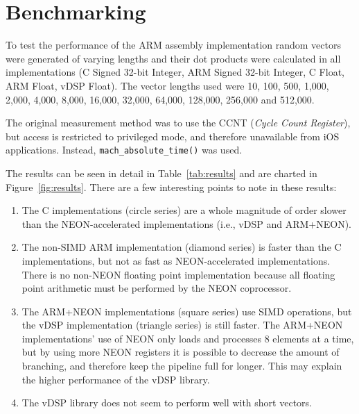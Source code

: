 \documentclass[oneside,a4paper]{report}
\begin{document}
\section{Benchmarking}

To test the performance of the ARM assembly implementation random vectors were generated of varying lengths and their dot products were calculated in all implementations (C Signed 32-bit Integer, ARM Signed 32-bit Integer, C Float, ARM Float, vDSP Float). The vector lengths used were 10, 100, 500, 1,000, 2,000, 4,000, 8,000, 16,000, 32,000, 64,000, 128,000, 256,000 and 512,000.

The original measurement method was to use the CCNT (\emph{Cycle Count Register}), but access is restricted to privileged mode, and therefore unavailable from iOS applications. Instead, \texttt{mach\_absolute\_time()} was used.

The results can be seen in detail in Table~\ref{tab:results} and are charted in Figure~\ref{fig:results}. There are a few interesting points to note in these results:
\begin{enumerate}
	\item The C implementations (circle series) are a whole magnitude of order slower than the NEON-accelerated implementations (i.e., vDSP and ARM+NEON).
	\item The non-SIMD ARM implementation (diamond series) is faster than the C implementations, but not as fast as NEON-accelerated implementations. There is no non-NEON floating point implementation because all floating point arithmetic must be performed by the NEON coprocessor.
	\item The ARM+NEON implementations (square series) use SIMD operations, but the vDSP implementation (triangle series) is still faster. The ARM+NEON implementations' use of NEON only loads and processes 8 elements at a time, but by using more NEON registers it is possible to decrease the amount of branching, and therefore keep the pipeline full for longer. This may explain the higher performance of the vDSP library.
	\item The vDSP library does not seem to perform well with short vectors.
\end{enumerate}
\end{document}
